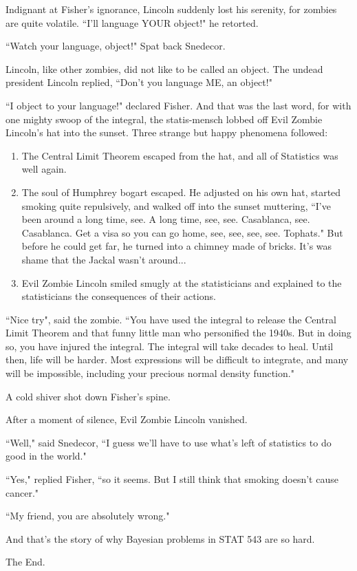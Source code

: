 \documentclass{article}
\begin{document}
Indignant at Fisher's ignorance, Lincoln suddenly lost his serenity, for zombies are quite volatile. ``I'll language YOUR object!" he retorted. \newline

``Watch your language, object!" Spat back Snedecor. \newline

Lincoln, like other zombies, did not like to be called an object. The undead president Lincoln replied, ``Don't you language ME, an object!" \newline

``I object to your language!" declared Fisher. And that was the last word, for with one mighty swoop of the integral, the statis-mensch lobbed off Evil Zombie Lincoln's hat into the sunset. Three strange but happy phenomena followed: \newline

\begin{enumerate}
\item The Central Limit Theorem escaped from the hat, and all of Statistics was well again.
\item The soul of Humphrey bogart escaped. He adjusted on his own hat, started smoking quite repulsively, and walked off into the sunset muttering, ``I've been around a long time, see. A long time, see, see. Casablanca, see. Casablanca. Get a visa so you can go home, see, see, see, see. Tophats." But before he could get far, he turned into a chimney made of bricks. It's was shame that the Jackal wasn't around...
\item Evil Zombie Lincoln smiled smugly at the statisticians and explained to the statisticians the consequences of their actions.
\end{enumerate}

``Nice try", said the zombie. ``You have used the integral to release the Central Limit Theorem and that funny little man who personified the 1940s. But in doing so, you have injured the integral. The integral will take decades to heal. Until then, life will be harder. Most expressions will be difficult to integrate, and many will be impossible, including your precious normal density function."\newline

A cold shiver shot down Fisher's spine. \newline

After a moment of silence, Evil Zombie Lincoln vanished. \newline

``Well," said Snedecor, ``I guess we'll have to use what's left of statistics to do good in the world." \newline

``Yes," replied Fisher, ``so it seems. But I still think that smoking doesn't cause cancer." \newline

``My friend, you are absolutely wrong." \newline

And that's the story of why Bayesian problems in STAT 543 are so hard. \newline

\begin{center}
The End.
\end{center}
\end{document}
